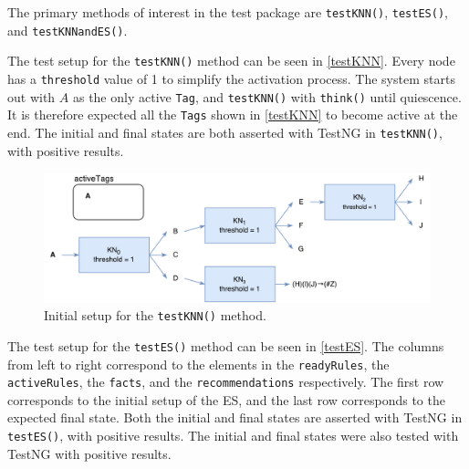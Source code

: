 \documentclass[titlepage,11pt]{article}
\newcommand{\code}[1]{\texttt{#1}}
\begin{document}
The primary methods of interest in the test package are \code{testKNN()}, \code{testES()}, and \code{testKNNandES()}.

The test setup for the \code{testKNN()} method can be seen in \autoref{testKNN}. Every node has a \code{threshold} value of 1 to simplify the activation process. The system starts out with $A$ as the only active \code{Tag}, and \code{testKNN()} with \code{think()} until quiescence. It is therefore expected all the \code{Tags} shown in \autoref{testKNN} to become active at the end. The initial and final states are both asserted with TestNG in \code{testKNN()}, with positive results.

\begin{figure}[!htb]
	\includegraphics[width=\textwidth]{figures/testKNN.pdf}
	\caption[Setup for the \code{testKNN()} method.]
	{Initial setup for the \code{testKNN()} method.}
	\label{testKNN}
\end{figure}

The test setup for the \code{testES()} method can be seen in \autoref{testES}. The columns from left to right correspond to the elements in the \code{readyRules}, the \code{activeRules}, the \code{facts}, and the \code{recommendations} respectively. The first row corresponds to the initial setup of the ES, and the last row corresponds to the expected final state. Both the initial and final states are asserted with TestNG in \code{testES()}, with positive results. The initial and final states were also tested with TestNG with positive results.
\end{document}
